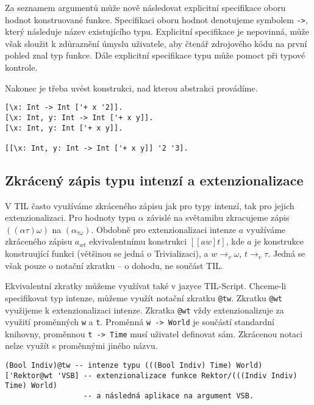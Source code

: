 Za seznamem argumentů může nově následovat explicitní specifikace oboru hodnot konstruované funkce.
Specifikaci oboru hodnot denotujeme symbolem \lstinline{->}, který následuje název existujícího
typu. Explicitní specifikace je nepovinná, může však sloužit k zdůraznění úmyslu uživatele, aby
čtenář zdrojového kódu na první pohled znal typ funkce. Dále explicitní specifikace typu může
pomoct při typové kontrole.

Nakonec je třeba uvést konstrukci, nad kterou abstrakci provádíme.

\begin{lstlisting}[caption={Příklad využití Uzávěrů}]
[\x: Int -> Int ['+ x '2]].
[\x: Int, y: Int -> Int ['+ x y]].
[\x: Int, y: Int ['+ x y]].

[[\x: Int, y: Int -> Int ['+ x y]] '2 '3].
\end{lstlisting}

\subsection{Zkrácený zápis typu intenzí a extenzionalizace}

V TIL často využíváme zkráceného zápisu jak pro typy intenzí, tak pro jejich extenzionalizaci.
Pro hodnoty typu $\alpha$ závislé na světamihu zkracujeme zápis $((\alpha\tau)\omega)$
na $(\alpha_{\tau\omega})$. Obdobně pro extenzionalizaci intenze $a$ využíváme zkráceného zápisu
$a_{wt}$ ekvivalentnímu konstrukci $[[a w] t]$, kde $a$ je konstrukce konstruující funkci
(většinou se jedná o Trivializaci), a $w \rightarrow_v \omega$, $t \rightarrow_v \tau$. Jedná
se však pouze o notační zkratku -- o dohodu, ne součást TIL.

Ekvivalentní zkratky můžeme využívat také v jazyce TIL-Script. Chceme-li specifikovat typ intenze,
můžeme využít notační zkratku \lstinline{@tw}. Zkratku \lstinline{@wt} využijeme k extenzionalizaci
intenze. Zkratka \lstinline{@wt} vždy extenzionalizuje za využití proměnných \lstinline{w} a
\lstinline{t}. Proměnná \lstinline{w -> World} je součástí standardní knihovny, proměnnou
\lstinline{t -> Time} musí uživatel definovat sám. Zkrácenou notaci nelze využít s proměnnými
jiného názvu.

\begin{lstlisting}[caption={Příklad využití zkrácené notace}]
(Bool Indiv)@tw -- intenze typu (((Bool Indiv) Time) World)
['Rektor@wt 'VSB] -- extenzionalizace funkce Rektor/(((Indiv Indiv) Time) World)
                  -- a následná aplikace na argument VSB.
\end{lstlisting}

